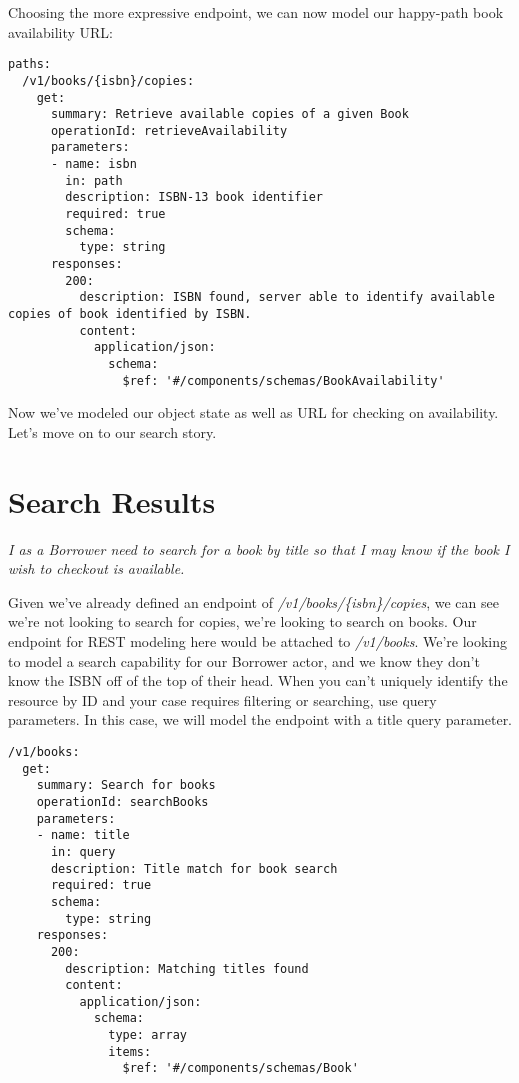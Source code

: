\begin{minipage}{\linewidth}
Choosing the more expressive endpoint, we can now model our happy-path book availability URL:

\begin{code}
\begin{lstlisting}[belowskip=-\baselineskip]
paths:
  /v1/books/{isbn}/copies:
    get:
      summary: Retrieve available copies of a given Book
      operationId: retrieveAvailability
      parameters:
      - name: isbn
        in: path
        description: ISBN-13 book identifier
        required: true
        schema:
          type: string
      responses:
        200:
          description: ISBN found, server able to identify available copies of book identified by ISBN.
          content:
            application/json:
              schema:
                $ref: '#/components/schemas/BookAvailability'
\end{lstlisting}
\end{code}
\end{minipage}

Now we've modeled our object state as well as URL for checking on availability.  Let's move on to our search story.

\section{Search Results}

\textit{I as a Borrower need to search for a book by title so that I may know if the book I wish to checkout is available.}

Given we've already defined an endpoint of \textit{/v1/books/\{isbn\}/copies}, we can see we're not looking to search for copies, we're looking to search on books.  Our endpoint for REST modeling here would be attached to \textit{/v1/books}.  We're looking to model a search capability for our Borrower actor, and we know they don't know the ISBN off of the top of their head.  When you can't uniquely identify the resource by ID and your case requires filtering or searching, use query parameters.   In this case, we will model the endpoint with a title query parameter.

\begin{minipage}{\linewidth}

\begin{code}
\begin{lstlisting}[belowskip=-\baselineskip]
/v1/books:
  get:
    summary: Search for books
    operationId: searchBooks
    parameters:
    - name: title
      in: query
      description: Title match for book search
      required: true
      schema:
        type: string
    responses:
      200:
        description: Matching titles found
        content:
          application/json:
            schema:
              type: array
              items:
                $ref: '#/components/schemas/Book'
\end{lstlisting}
\end{code}
\end{minipage}

